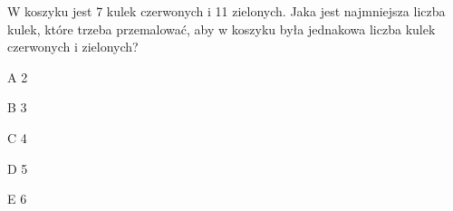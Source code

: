 \begin{tresc}
W koszyku jest 7 kulek czerwonych i 11 zielonych. Jaka jest najmniejsza liczba kulek, które trzeba przemalować, aby w koszyku była jednakowa liczba kulek czerwonych i zielonych?
\end{tresc}
\begin{wariant}{A} 2 \end{wariant}
\begin{wariant}{B} 3 \end{wariant}
\begin{wariant}{C} 4 \end{wariant}
\begin{wariant}{D} 5 \end{wariant}
\begin{wariant}{E} 6 \end{wariant}
